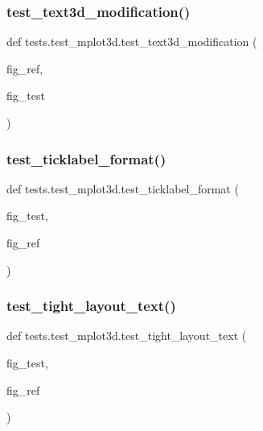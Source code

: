 \subsubsection{\texorpdfstring{test\+\_\+text3d\+\_\+modification()}{test\_text3d\_modification()}}
{\footnotesize\ttfamily def tests.\+test\+\_\+mplot3d.\+test\+\_\+text3d\+\_\+modification (\begin{DoxyParamCaption}\item[{}]{fig\+\_\+ref,  }\item[{}]{fig\+\_\+test }\end{DoxyParamCaption})}

\mbox{\label{namespacetests_1_1test__mplot3d_a3015b39e0dee5af64bbf02cc9ea200fc}} 
\subsubsection{\texorpdfstring{test\+\_\+ticklabel\+\_\+format()}{test\_ticklabel\_format()}}
{\footnotesize\ttfamily def tests.\+test\+\_\+mplot3d.\+test\+\_\+ticklabel\+\_\+format (\begin{DoxyParamCaption}\item[{}]{fig\+\_\+test,  }\item[{}]{fig\+\_\+ref }\end{DoxyParamCaption})}

\mbox{\label{namespacetests_1_1test__mplot3d_a41c7863d0173173fafcaea044c52a9e4}} 
\subsubsection{\texorpdfstring{test\+\_\+tight\+\_\+layout\+\_\+text()}{test\_tight\_layout\_text()}}
{\footnotesize\ttfamily def tests.\+test\+\_\+mplot3d.\+test\+\_\+tight\+\_\+layout\+\_\+text (\begin{DoxyParamCaption}\item[{}]{fig\+\_\+test,  }\item[{}]{fig\+\_\+ref }\end{DoxyParamCaption})}


